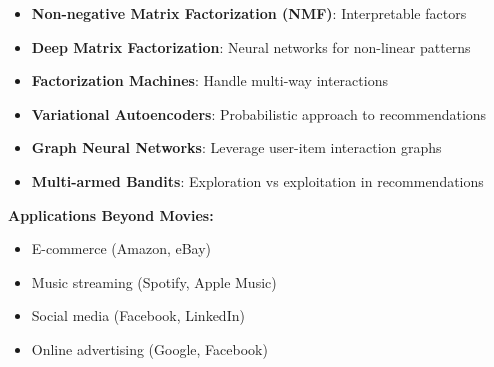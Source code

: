 \documentclass{beamer}
\begin{document}
\begin{frame}\begin{itemize}
\item \textbf{Non-negative Matrix Factorization (NMF)}: Interpretable factors
    
    \pause
\item \textbf{Deep Matrix Factorization}: Neural networks for non-linear patterns
    
    \pause
\item \textbf{Factorization Machines}: Handle multi-way interactions
    
    \pause
\item \textbf{Variational Autoencoders}: Probabilistic approach to recommendations
    
    \pause
\item \textbf{Graph Neural Networks}: Leverage user-item interaction graphs
    
    \pause
\item \textbf{Multi-armed Bandits}: Exploration vs exploitation in recommendations
\end{itemize}

\pause
\textbf{Applications Beyond Movies:}
\begin{itemize}
\item E-commerce (Amazon, eBay)
    \item Music streaming (Spotify, Apple Music)  
    \pause
\item Social media (Facebook, LinkedIn)
    \item Online advertising (Google, Facebook)
\end{itemize}
\end{frame}
\end{document}
